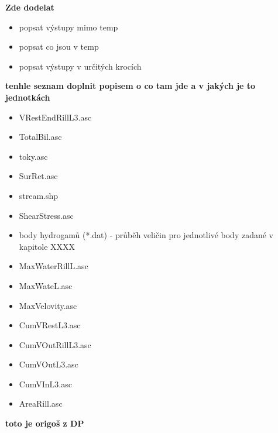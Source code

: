 \textbf{Zde dodelat}
\begin{itemize}
\item popsat výstupy mimo temp
\item popsat co jsou v temp
\item popsat výstupy v určitých krocích
\end{itemize}
\textbf{tenhle seznam doplnit popisem o co tam jde a v jakých je to jednotkách}
\begin{itemize}
\item VRestEndRillL3.asc
\item TotalBil.asc
\item toky.asc
\item SurRet.asc
\item stream.shp
\item ShearStress.asc
\item body hydrogamů (*.dat) - průběh veličin pro jednotlivé body zadané v kapitole XXXX
\item MaxWaterRillL.asc
\item MaxWateL.asc
\item MaxVelovity.asc
\item CumVRestL3.asc
\item CumVOutRillL3.asc
\item CumVOutL3.asc
\item CumVInL3.asc
\item AreaRill.asc
\end{itemize}

\textbf{toto je origoš z DP}

